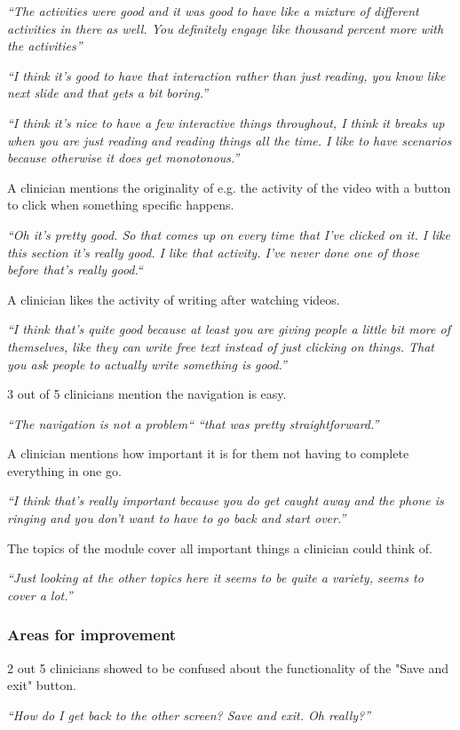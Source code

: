 \documentclass{sigchi}
\begin{document}
\textit{“The activities were good and it was good to have like a mixture of different activities in there as well. You definitely engage like thousand percent more with the activities”}

\textit{“I think it's good to have that interaction rather than just reading, you know like next slide and that gets a bit boring.”}

\textit{“I think it’s nice to have a few interactive things throughout, I think it breaks up when you are just reading and reading things all the time. I like to have scenarios because otherwise it does get monotonous.”}

A clinician mentions the originality of e.g. the activity of the video with a button to click when something specific happens.

\textit{“Oh it’s pretty good. So that comes up on every time that I’ve clicked on it. I like this section it’s really good. I like that activity. I’ve never done one of those before that’s really good.“}

A clinician likes the activity of writing after watching videos.

\textit{“I think that’s quite good because at least you are giving people a little bit more of themselves, like they can write free text instead of just clicking on things. That you ask people to actually write something is good.”}

3 out of 5 clinicians mention the navigation is easy.

\textit{“The navigation is not a problem“ “that was pretty straightforward.”}

A clinician mentions how important it is for them not having to complete everything in one go.

\textit{“I think that’s really important because you do get caught away and the phone is ringing and you don’t want to have to go back and start over.”}

The topics of the module cover all important things a clinician could think of.

\textit{“Just looking at the other topics here it seems to be quite a variety, seems to cover a lot.”}

\subsubsection{Areas for improvement}
2 out 5 clinicians showed to be confused about the functionality of the "Save and exit" button.

\textit{“How do I get back to the other screen? Save and exit. Oh really?”}
\end{document}
